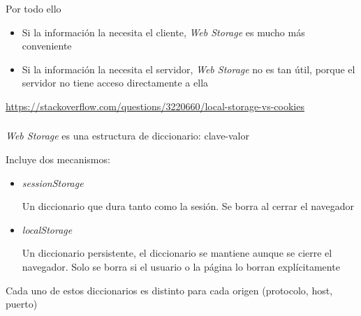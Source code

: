 \documentclass[ucs]{beamer}
\begin{document}
\begin{frame}[fragile]

Por todo ello

    \begin{itemize}
    \item
Si la información la necesita el cliente, 
\emph{Web Storage} 
es mucho más conveniente

    \item
Si la información la necesita el servidor, 
\emph{Web Storage} 
no es tan útil, porque
el servidor no tiene acceso directamente a ella
    \end{itemize}


\begin{tiny}
\begin{flushright}
\url{https://stackoverflow.com/questions/3220660/local-storage-vs-cookies}
\end{flushright}
\end{tiny}
\end{frame}

\begin{frame}[fragile]
\frametitle{}

\emph{Web Storage} 
es una estructura de diccionario: clave-valor


Incluye dos mecanismos:
\begin{itemize}
\item

\emph{sessionStorage}

Un diccionario que dura tanto como la sesión. Se borra al cerrar el navegador


\item
\emph{localStorage} 

Un diccionario persistente, el diccionario se mantiene aunque se cierre el navegador. Solo
se borra si el usuario o la página lo borran explícitamente

\end{itemize}

Cada uno de estos diccionarios es distinto para cada origen (protocolo, host, puerto)
\end{frame}
\end{document}
